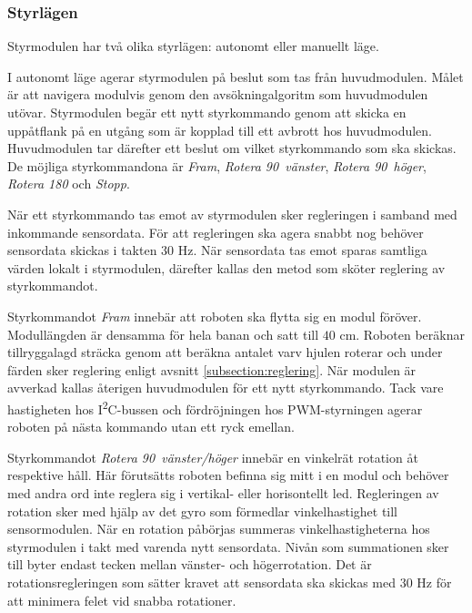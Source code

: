 \documentclass[11pt]{article}
\begin{document}
\begin{flushleft}
\subsubsection{Styrlägen}
Styrmodulen har två olika styrlägen: autonomt eller manuellt läge.
\begin{description}[style=unboxed, leftmargin=0cm]
  \item[Autonomt läge]
I autonomt läge agerar styrmodulen på beslut som tas från huvudmodulen. Målet är att navigera modulvis genom den avsökningalgoritm som huvudmodulen utövar. Styrmodulen begär ett nytt styrkommando genom att skicka en uppåtflank på en utgång som är kopplad till ett avbrott hos huvudmodulen. Huvudmodulen tar därefter ett beslut om vilket styrkommando som ska skickas. De möjliga styrkommandona är \textit{Fram}, \textit{Rotera 90\textdegree\ vänster}, \textit{Rotera 90\textdegree\ höger}, \textit{Rotera 180\textdegree} och \textit{Stopp}. 

När ett styrkommando tas emot av styrmodulen sker regleringen i samband med inkommande sensordata. För att regleringen ska agera snabbt nog behöver sensordata skickas i takten $30$ Hz. När sensordata tas emot sparas samtliga värden lokalt i styrmodulen, därefter kallas den metod som sköter reglering av styrkommandot. 

Styrkommandot \textit{Fram} innebär att roboten ska flytta sig en modul föröver. Modullängden är densamma för hela banan och satt till $40$ cm. Roboten beräknar tillryggalagd sträcka genom att beräkna antalet varv hjulen roterar och under färden sker reglering enligt avsnitt \ref{subsection:reglering}. När modulen är avverkad kallas återigen huvudmodulen för ett nytt styrkommando. Tack vare hastigheten hos I\textsuperscript{2}C-bussen och fördröjningen hos PWM-styrningen agerar roboten på nästa kommando utan ett ryck emellan. 

Styrkommandot \textit{Rotera 90\textdegree\ vänster/höger} innebär en vinkelrät rotation åt respektive håll. Här förutsätts roboten befinna sig mitt i en modul och behöver med andra ord inte reglera sig i vertikal- eller horisontellt led. Regleringen av rotation sker med hjälp av det gyro som förmedlar vinkelhastighet till sensormodulen. När en rotation påbörjas summeras vinkelhastigheterna hos styrmodulen i takt med varenda nytt sensordata. Nivån som summationen sker till byter endast tecken mellan vänster- och högerrotation. Det är rotationsregleringen som sätter kravet att sensordata ska skickas med $30$ Hz för att minimera felet vid snabba rotationer. 


\end{description}
\end{flushleft}
\end{document}
